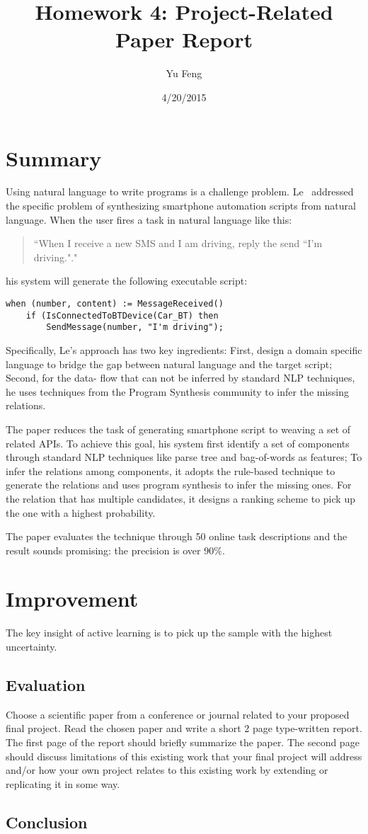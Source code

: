 \documentclass[10pt]{article}
\title{Homework 4: Project-Related Paper Report}
\author{Yu Feng}
\date{4/20/2015}
\begin{document}
\maketitle

\section{Summary}\label{sec:intro}
Using natural language to write programs is a challenge problem.
Le~\cite{smart} addressed the specific problem of synthesizing smartphone 
automation scripts from natural language. When the user fires a task in 
natural language like this:
\begin{quotation}
``When I receive a new SMS and I am driving, reply the send ``I'm driving."."
\end{quotation}
his system will generate the following executable script:
\small\begin{verbatim}
when (number, content) := MessageReceived()
    if (IsConnectedToBTDevice(Car_BT) then
        SendMessage(number, "I'm driving");
\end{verbatim}
Specifically, Le's approach has two key ingredients: First, design
a domain specific language to bridge the gap between natural language and the
target script; Second, for the data- flow that can not be inferred by 
standard NLP techniques, he uses techniques from the Program Synthesis community
to infer the missing relations.

The paper reduces the task of generating smartphone script to weaving a set of 
related APIs. To achieve this goal, his system first identify a set of components 
through standard NLP techniques like parse tree and bag-of-words as features; 
To infer the relations among components, it adopts the rule-based technique to 
generate the relations and uses program synthesis to infer the missing ones. For
the relation that has multiple candidates, it designs a ranking scheme to pick up
the one with a highest probability.

The paper evaluates the technique through 50 online task descriptions and the result
sounds promising: the precision is over 90\%.


\section{Improvement}\label{sec:alg}
The key insight of active learning is to pick up the sample with the highest 
uncertainty.  
\subsection{Evaluation}
Choose a scientific paper from a conference or journal related to your proposed final project. Read the chosen paper and write a short 2 page type-written report. The first page of the report should briefly summarize the paper. The second page should discuss limitations of this existing work that your final project will address and/or how your own project relates to this existing work by extending or replicating it in some way.

\subsection{Conclusion}




\end{document}
